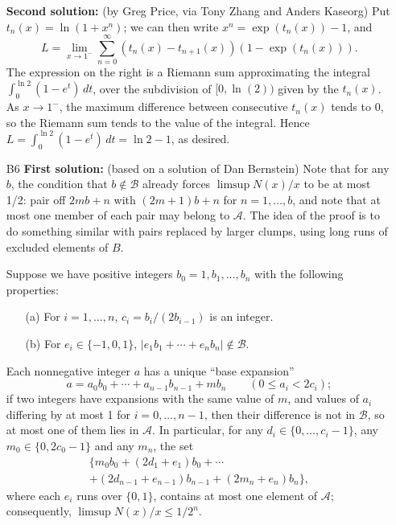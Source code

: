 \documentclass[amssymb,twocolumn,pra,10pt,aps]{revtex4-1}
\begin{document}
\begin{itemize}
\textbf{Second solution:}
(by Greg Price, via Tony Zhang and Anders Kaseorg)
Put $t_n(x) = \ln(1 + x^n)$;
we can then write $x^n = \exp(t_n(x)) - 1$, and
\[
L = \lim_{x \to 1^-} \sum_{n=0}^\infty (t_n(x) - t_{n+1}(x))(1 - \exp(t_n(x))).
\]
The expression on the right is a Riemann sum approximating the
integral $\int_0^{\ln 2} (1-e^t)\,dt$, over the subdivision of $[0,\ln(2))$
given by the $t_n(x)$. As $x \to 1^-$, the maximum difference between
consecutive $t_n(x)$ tends to 0, so the Riemann sum tends to the value
of the integral. Hence $L = \int_0^{\ln 2}(1 - e^t)\,dt = \ln 2 - 1$, as
desired.

\def\calA{\mathcal{A}}
\def\calB{\mathcal{B}}

\item[B6]
\textbf{First solution:}
(based on a solution of Dan Bernstein)
Note that for any $b$, the condition that $b \notin \calB$ already
forces $\limsup N(x)/x$ to be at most 1/2: pair off $2mb + n$ with
$(2m+1)b+n$ for $n=1,\dots, b$, and note that at most one member of each
pair may belong to $\calA$.
The idea of the proof is to do something
similar with pairs replaced by larger clumps, using long runs of
excluded elements of $B$.

Suppose we have positive integers
$b_0 = 1, b_1, \dots, b_n$ with
the following properties:
\begin{enumerate}
\item[(a)] For $i=1, \dots, n$,
$c_i = b_i/(2b_{i-1})$ is an integer.
\item[(b)] For $e_i \in \{-1,0,1\}$,
$|e_1b_1 + \cdots + e_n b_n| \notin \calB$.
\end{enumerate}
Each nonnegative integer $a$ has a unique ``base expansion''
\[
a = a_0 b_0 + \cdots + a_{n-1} b_{n-1} + m b_n \qquad (0 \leq a_i < 2c_i);
\]
if two integers have expansions with the same value of $m$, and values
of $a_i$ differing by at most 1 for $i=0, \dots, n-1$, then their
difference is not in $\calB$, so at most one of them lies in $\calA$.
In particular,
for any $d_i \in \{0, \dots, c_i - 1\}$, any $m_0 \in \{0, 2c_0 - 1\}$
and any $m_n$, the set
\begin{multline*}
\{m_0 b_0 + (2d_1 +e_1)b_0 + \cdots \\
+ (2d_{n-1} + e_{n-1})b_{n-1} + (2m_n + e_n)b_n\},
\end{multline*}
where each $e_i$ runs over $\{0,1\}$,
contains at most one element of $\calA$; consequently,
$\limsup N(x)/x \leq 1/2^{n}$.


\end{itemize}
\end{document}
